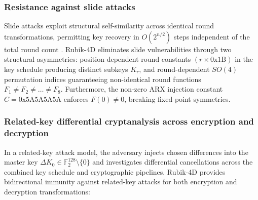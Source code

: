 \documentclass[10pt,twocolumn]{article}
\begin{document}
\subsubsection{Resistance against slide attacks}
Slide attacks exploit structural self-similarity across identical round transformations, permitting key recovery in $O(2^{n/2})$ steps independent of the total round count \cite{biryukov1999slide, biryukov2000slide}. Rubik-4D eliminates slide vulnerabilities through two structural asymmetries: position-dependent round constants $(r \times \text{0x1B})$ in the key schedule producing distinct subkeys $K_r$, and round-dependent $SO(4)$ permutation indices guaranteeing non-identical round functions $F_1 \neq F_2 \neq \dots \neq F_8$. Furthermore, the non-zero ARX injection constant $C = \text{0x5A5A5A5A}$ enforces $F(0) \neq 0$, breaking fixed-point symmetries.

\subsubsection{Related-key differential cryptanalysis across encryption and decryption}
\label{subsec:related_key}
In a related-key attack model, the adversary injects chosen differences into the master key $\Delta K_0 \in \mathbb{F}_2^{128} \setminus \{0\}$ and investigates differential cancellations across the combined key schedule and cryptographic pipelines. Rubik-4D provides bidirectional immunity against related-key attacks for both encryption and decryption transformations:
\end{document}
